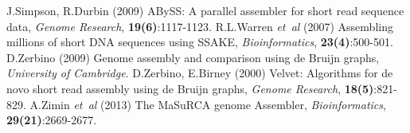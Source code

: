 \documentclass[12pt]{article}
\begin{document}
\begin{thebibliography}{}
 J.Simpson, R.Durbin (2009) ABySS: A parallel assembler for short read sequence data, \textit{Genome Research}, {\bf 19(6)}:1117-1123.
 R.L.Warren \textit{et~al} (2007) Assembling millions of short DNA sequences using SSAKE, \textit{Bioinformatics}, {\bf 23(4)}:500-501.
 D.Zerbino (2009) Genome assembly and comparison using de Bruijn graphs, \textit{University of Cambridge}.
 D.Zerbino, E.Birney (2000) Velvet: Algorithms for de novo short read assembly using de Bruijn graphs, \textit{Genome Research}, {\bf 18(5)}:821-829.
 A.Zimin \textit{et~al} (2013) The MaSuRCA genome Assembler, \textit{Bioinformatics}, {\bf 29(21)}:2669-2677.

\end{thebibliography}
\end{document}
